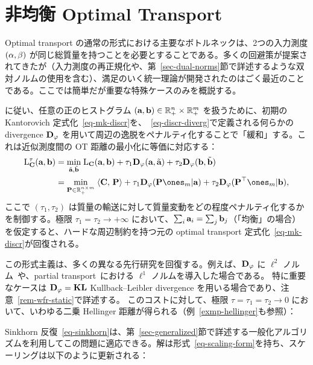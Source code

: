\section{非均衡 Optimal Transport}
\label{sec-unbalanced}

Optimal transport の通常の形式における主要なボトルネックは、2つの入力測度 $(\alpha,\beta)$ が同じ総質量を持つことを必要とすることである。多くの回避策が提案されてきたが（入力測度の再正規化や、第~\ref{sec-dual-norms}節で詳述するような双対ノルムの使用を含む）、満足のいく統一理論が開発されたのはごく最近のことである。ここでは簡単だが重要な特殊ケースのみを概説する。

\citet{LieroMielkeSavareLong}に従い、任意の正のヒストグラム $(\mathrm{\textbf{a}},\mathrm{\textbf{b}}) \in \mathbb{R}_+^n \times \mathbb{R}_+^m$ を扱うために、初期の Kantorovich 定式化~\eqref{eq-mk-discr}を、~\eqref{eq-discr-diverg}で定義される何らかの divergence $\mathrm{\textbf{D}}_\varphi$ を用いて周辺の逸脱をペナルティ化することで「緩和」する。これは近似測度間の OT 距離の最小化に等価に対応する：
\begin{align}\label{eq-unbalanced-pbm}
	\MKD_{\C}^\tau(\a,\b) &= \umin{\tilde\a,\tilde\b} \MKD_{\C}(\a,\b) + \tau_1 \DivergmD_\phi(\a,\tilde \a) + \tau_2 \DivergmD_\phi(\b,\tilde\b) \\
		&= \umin{\P \in \RR_+^{n \times m}} \dotp{\C}{\P} + \tau_1\DivergmD_\phi(\P\ones_m|\a) + \tau_2\DivergmD_\phi(\P^\top\ones_m|\b),
\end{align}
ここで $(\tau_1,\tau_2)$ は質量の輸送に対して質量変動をどの程度ペナルティ化するかを制御する。極限 $\tau_1=\tau_2 \rightarrow +\infty$ において、$\sum_i \mathrm{\textbf{a}}_i=\sum_j \mathrm{\textbf{b}}_j$（「均衡」の場合）を仮定すると、ハードな周辺制約を持つ元の optimal transport 定式化~\eqref{eq-mk-discr}が回復される。

この形式主義は、多くの異なる先行研究を回復する。例えば、$\mathrm{\textbf{D}}_\varphi$ に $\ell^2$ ノルム~\citep{benamou2003numerical}や、partial transport~\citep{FigalliPartial,CaffarelliMcCannPartial}における $\ell^1$ ノルムを導入した場合である。
特に重要なケースは $\mathrm{\textbf{D}}_\varphi=\mathrm{\textbf{KL}}$ Kullback--Leibler divergence を用いる場合であり、注意~\ref{rem-wfr-static}で詳述する。
このコストに対して、極限 $\tau=\tau_1=\tau_2 \rightarrow 0$ において、いわゆる二乗 Hellinger 距離が得られる（例~\ref{exmp-hellinger}も参照）：

Sinkhorn 反復~\eqref{eq-sinkhorn}は、第~\ref{sec-generalized}節で詳述する一般化アルゴリズムを利用してこの問題に適応できる。解は形式~\eqref{eq-scaling-form}を持ち、スケーリングは以下のように更新される：

